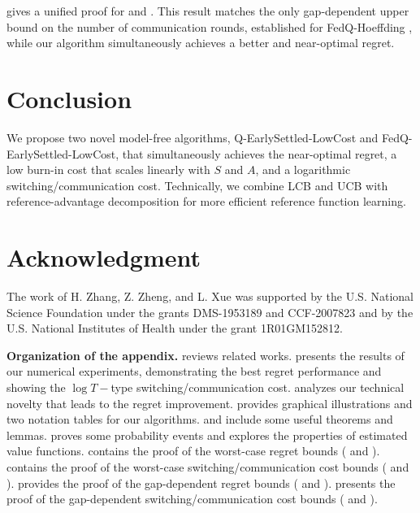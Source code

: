 \documentclass{article}
\begin{document}
 gives a unified proof for  and . This result matches the only gap-dependent upper bound on the number of communication rounds, established for FedQ-Hoeffding \citep{zhang2025gapdependent}, while our algorithm simultaneously achieves a better and near-optimal regret.

\section{Conclusion}
We propose two novel model-free algorithms, Q-EarlySettled-LowCost and FedQ-EarlySettled-LowCost, that simultaneously achieves the near-optimal regret, a low burn-in cost that scales linearly with $S$ and $A$, and a logarithmic switching/communication cost. Technically, we combine LCB and UCB with reference-advantage decomposition for more efficient reference function learning.

\section*{Acknowledgment}
The work of H. Zhang, Z. Zheng, and L. Xue was supported by the U.S. National Science Foundation under the grants DMS-1953189 and CCF-2007823 and by the U.S. National Institutes of Health under the grant 1R01GM152812.




\newpage
\appendix
\onecolumn
\textbf{Organization of the appendix.}
 reviews related works.  presents the results of our numerical experiments, demonstrating the best regret performance and showing the \(\log T-\)type switching/communication cost.  analyzes our technical novelty that leads to the regret improvement.  provides graphical illustrations and two notation tables for our algorithms.   and  include some useful theorems and lemmas.  proves some probability events and  explores the properties of estimated value functions.  contains the proof of the worst-case regret bounds ( and ).  contains the proof of the worst-case switching/communication cost bounds ( and ).  provides the proof of the gap-dependent regret bounds ( and ).  presents the proof of the gap-dependent switching/communication cost bounds ( and ). 
\end{document}
